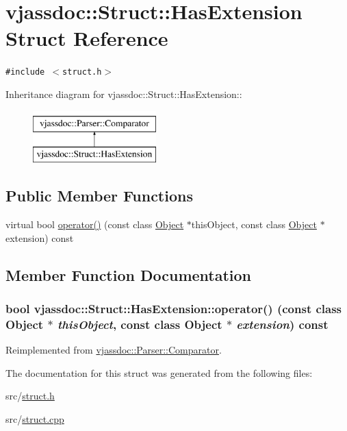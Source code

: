 \hypertarget{structvjassdoc_1_1Struct_1_1HasExtension}{
\section{vjassdoc::Struct::HasExtension Struct Reference}
\label{structvjassdoc_1_1Struct_1_1HasExtension}
}
{\tt \#include $<$struct.h$>$}

Inheritance diagram for vjassdoc::Struct::HasExtension::\begin{figure}[H]
\begin{center}
\leavevmode
\includegraphics[height=2cm]{structvjassdoc_1_1Struct_1_1HasExtension}
\end{center}
\end{figure}
\subsection*{Public Member Functions}
\begin{CompactItemize}
\item 
virtual bool \hyperlink{structvjassdoc_1_1Struct_1_1HasExtension_9e08804f805e2ba8616088ec0bfe84e2}{operator()} (const class \hyperlink{classvjassdoc_1_1Object}{Object} $\ast$thisObject, const class \hyperlink{classvjassdoc_1_1Object}{Object} $\ast$extension) const 
\end{CompactItemize}


\subsection{Member Function Documentation}
\hypertarget{structvjassdoc_1_1Struct_1_1HasExtension_9e08804f805e2ba8616088ec0bfe84e2}{
\subsubsection{\setlength{\rightskip}{0pt plus 5cm}bool vjassdoc::Struct::HasExtension::operator() (const class {\bf Object} $\ast$ {\em thisObject}, const class {\bf Object} $\ast$ {\em extension}) const}}
\label{structvjassdoc_1_1Struct_1_1HasExtension_9e08804f805e2ba8616088ec0bfe84e2}




Reimplemented from \hyperlink{structvjassdoc_1_1Parser_1_1Comparator_c27d6790182d87751bcf134a0d01481a}{vjassdoc::Parser::Comparator}.

The documentation for this struct was generated from the following files:\begin{CompactItemize}
\item 
src/\hyperlink{struct_8h}{struct.h}\item 
src/\hyperlink{struct_8cpp}{struct.cpp}\end{CompactItemize}
